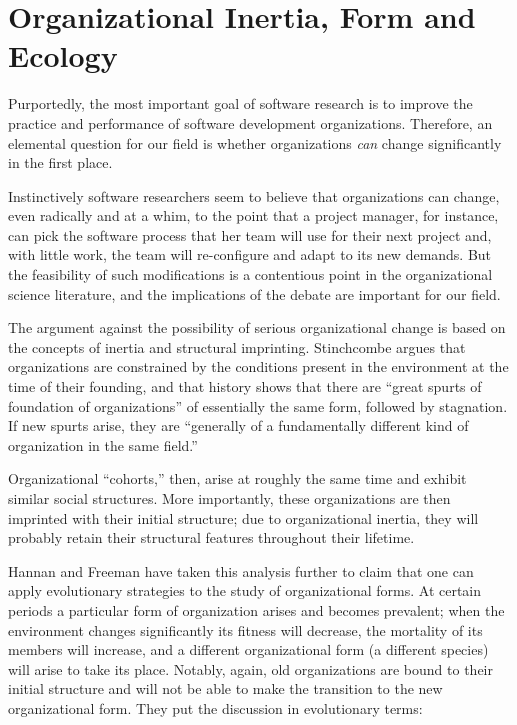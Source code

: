 \section{Organizational Inertia, Form and Ecology}

Purportedly, the most important goal of software research is to improve the practice and performance of software development organizations. Therefore, an elemental question for our field is whether organizations \emph{can} change significantly in the first place.

Instinctively software researchers seem to believe that organizations can change, even radically and at a whim, to the point that a project manager, for instance, can pick the software process that her team will use for their next project and, with little work, the team will re-configure and adapt to its new demands. But the feasibility of such modifications is a contentious point in the organizational science literature, and the implications of the debate are important for our field.

The argument against the possibility of serious organizational change is based on the concepts of inertia and structural imprinting. Stinchcombe  argues that organizations are constrained by the conditions present in the environment at the time of their founding, and that history shows that there are ``great spurts of foundation of organizations'' of essentially the same form, followed by stagnation. If new spurts arise, they are ``generally of a fundamentally different kind of organization in the same field.''

Organizational ``cohorts,'' then, arise at roughly the same time and exhibit similar social structures. More importantly, these organizations are then imprinted with their initial structure; due to organizational inertia, they will probably retain their structural features throughout their lifetime.

Hannan and Freeman  have taken this analysis further to claim that one can apply evolutionary strategies to the study of organizational forms. At certain periods a particular form of organization arises and becomes prevalent; when the environment changes significantly its fitness will decrease, the mortality of its members will increase, and a different organizational form (a different species) will arise to take its place. Notably, again, old organizations are bound to their initial structure and will not be able to make the transition to the new organizational form. They put the discussion in evolutionary terms:

